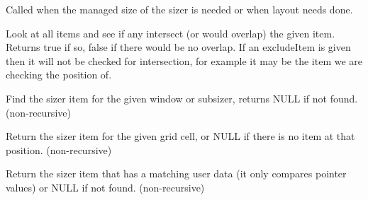 
Called when the managed size of the sizer is needed or when layout
needs done.


\label{wxgridbagsizercheckforintersection}



Look at all items and see if any intersect (or would overlap) the given
item.  Returns true if so, false if there would be no overlap.  If an
excludeItem is given then it will not be checked for intersection, for
example it may be the item we are checking the position of.



\label{wxgridbagsizerfinditem}



Find the sizer item for the given window or subsizer, returns NULL if
not found. (non-recursive)



\label{wxgridbagsizerfinditematposition}


Return the sizer item for the given grid cell, or NULL if there is no
item at that position. (non-recursive)



\label{wxgridbagsizerfinditemwithdata}


Return the sizer item that has a matching user data (it only compares
pointer values) or NULL if not found. (non-recursive)



\label{wxgridbagsizergetcellsize}


